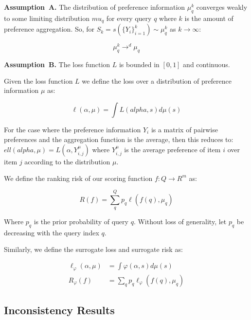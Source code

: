 \documentclass[a4paper,10pt]{article}
\newenvironment{assumption}[1][]{\par\medskip
   \noindent \textbf{Assumption~#1.} \rmfamily}{\medskip}
\begin{document}
\begin{assumption}[A]
  The distribution of preference information \(\mu_q^k\) converges weakly to some limiting distribution \(mu_q\) for every query \(q\) where \(k\) is the amount of preference aggregation. So, for \(S_k = s(\{Y_i\}_{i=1}^k) \sim \mu_q^k\) as \(k \rightarrow \infty\):

  \begin{equation}
    \mu_q^k \rightarrow^d \mu_q
  \end{equation}

\end{assumption}

\begin{assumption}[B]
  The loss function \(L\) is bounded in \([0,1]\) and continuous.
\end{assumption}

Given the loss function \(L\) we define the loss over a distribution of preference information \(\mu\) as:

\begin{equation}
  \ell(\alpha, \mu) = \int L(alpha, s) d\mu(s)
\end{equation}

For the case where the preference information \(Y_i\) is a matrix of pairwise preferences and the aggregation function is the average, then this reduces to: \(ell(alpha, \mu) = L(\alpha, Y_{i,j}^\mu)\) where \(Y_{i,j}^\mu\) is the average preference of item \(i\) over item \(j\) according to the distribution \(\mu\).

We define the ranking risk of our scoring function \(f: Q \rightarrow R^m\) as:

\begin{equation}
  R(f) = \sum_q^Q p_q \ell(f(q), \mu_q)
\end{equation}

Where \(p_q\) is the prior probability of query \(q\). Without loss of generality, let \(p_q\) be decreasing with the query index \(q\).

Similarly, we define the surrogate loss and surrogate risk as:

\begin{align}
  \ell_\varphi(\alpha, \mu) &= \int \varphi(\alpha, s) d\mu(s) \\
  R_\varphi(f) &= \sum_qp_q\ell_\varphi(f(q), \mu_q)
\end{align}

\subsection{Inconsistency Results}
\end{document}
